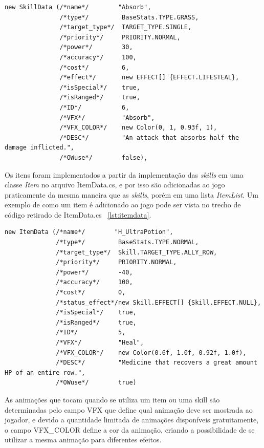 \begin{lstlisting}
new SkillData (/*name*/        "Absorb", 
               /*type*/         BaseStats.TYPE.GRASS, 
               /*target_type*/  TARGET_TYPE.SINGLE, 
               /*priority*/     PRIORITY.NORMAL, 
               /*power*/        30, 
               /*accuracy*/     100, 
               /*cost*/         6,
               /*effect*/       new EFFECT[] {EFFECT.LIFESTEAL}, 
               /*isSpecial*/    true, 
               /*isRanged*/     true,
               /*ID*/           6,
               /*VFX*/          "Absorb",
               /*VFX_COLOR*/    new Color(0, 1, 0.93f, 1),
               /*DESC*/         "An attack that absorbs half the damage inflicted.",
               /*OWuse*/        false),
\end{lstlisting}

	Os itens foram implementados a partir da implementação das \emph{skills} em uma classe \emph{Item} no arquivo ItemData.cs, e por isso são adicionadas ao jogo praticamente da mesma maneira que as \emph{skills}, porém em uma lista \emph{ItemList}. Um exemplo de como um item é adicionado ao jogo pode ser vista no trecho de código retirado de ItemData.cs ~\ref{lst:itemdata}.
	
\begin{lstlisting}
new ItemData (/*name*/        "H_UltraPotion", 
              /*type*/         BaseStats.TYPE.NORMAL, 
              /*target_type*/  Skill.TARGET_TYPE.ALLY_ROW, 
              /*priority*/     PRIORITY.NORMAL, 
              /*power*/        -40, 
              /*accuracy*/     100, 
              /*cost*/         0,
              /*status_effect*/new Skill.EFFECT[] {Skill.EFFECT.NULL}, 
              /*isSpecial*/    true, 
              /*isRanged*/     true,
              /*ID*/           5,
              /*VFX*/          "Heal",
              /*VFX_COLOR*/    new Color(0.6f, 1.0f, 0.92f, 1.0f),
              /*DESC*/         "Medicine that recovers a great amount HP of an entire row.",
              /*OWuse*/        true)
\end{lstlisting}

	As animações que tocam quando se utiliza um item ou uma skill são determinadas pelo campo VFX que define qual animação deve ser mostrada ao jogador, e devido a quantidade limitada de animações disponíveis gratuitamente, o campo VFX\_COLOR define a cor da animação, criando a possibilidade de se utilizar a mesma animação para diferentes efeitos.

